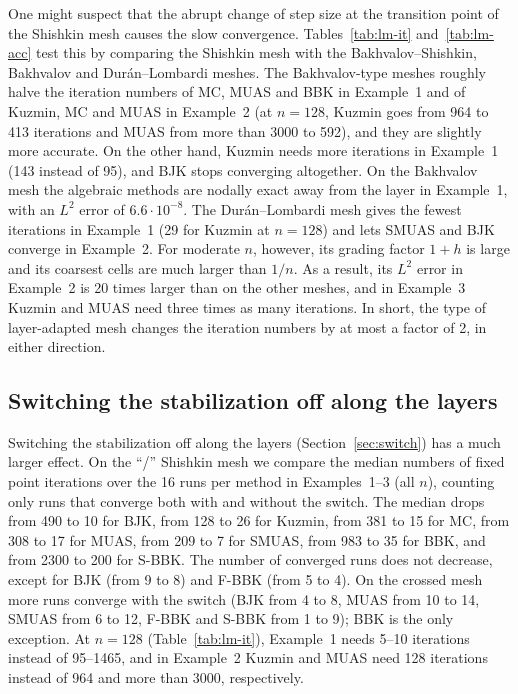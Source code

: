 \documentclass[11pt,a4paper]{article}
\theoremstyle{remark}
\begin{document}
One might suspect that the abrupt change of step size at the transition point of the Shishkin mesh causes the slow
convergence. Tables~\ref{tab:lm-it} and~\ref{tab:lm-acc} test this by comparing the Shishkin mesh with the
Bakhvalov--Shishkin, Bakhvalov and Dur\'an--Lombardi meshes. The Bakhvalov-type meshes roughly halve the iteration
numbers of MC, MUAS and BBK in Example~1 and of Kuzmin, MC and MUAS in Example~2 (at $n=128$, Kuzmin goes from 964 to
413 iterations and MUAS from more than 3000 to 592), and they are slightly more accurate. On the other hand, Kuzmin
needs more iterations in Example~1 (143 instead of 95), and BJK stops converging altogether. On the Bakhvalov mesh the
algebraic methods are nodally exact away from the layer in Example~1, with an $L^2$ error of $6.6\cdot10^{-8}$. The
Dur\'an--Lombardi mesh gives the fewest iterations in Example~1 (29 for Kuzmin at $n=128$) and lets SMUAS and BJK
converge in Example~2. For moderate $n$, however, its grading factor $1+h$ is large and its coarsest cells are much
larger than $1/n$. As a result, its $L^2$ error in Example~2 is 20 times larger than on the other meshes, and in
Example~3 Kuzmin and MUAS need three times as many iterations. In short, the type of layer-adapted mesh changes the
iteration numbers by at most a factor of 2, in either direction.

\subsection{Switching the stabilization off along the layers}




Switching the stabilization off along the layers (Section~\ref{sec:switch}) has a much larger effect. On the ``/''
Shishkin mesh we compare the median numbers of fixed point iterations over the 16 runs per method in Examples~1--3
(all $n$), counting only runs that converge both with and without the switch. The median drops from 490 to 10 for
BJK, from 128 to 26 for Kuzmin, from 381 to 15 for MC, from 308 to 17 for MUAS, from 209 to 7 for SMUAS, from 983 to
35 for BBK, and from 2300 to 200 for S-BBK. The number of converged runs does not decrease, except for BJK (from 9 to
8) and F-BBK (from 5 to 4). On the crossed mesh more runs converge with the switch (BJK from 4 to 8, MUAS from 10 to
14, SMUAS from 6 to 12, F-BBK and S-BBK from 1 to 9); BBK is the only exception. At $n=128$
(Table~\ref{tab:lm-it}), Example~1 needs 5--10 iterations instead of 95--1465, and in Example~2 Kuzmin and MUAS need
128 iterations instead of 964 and more than 3000, respectively.
\end{document}
